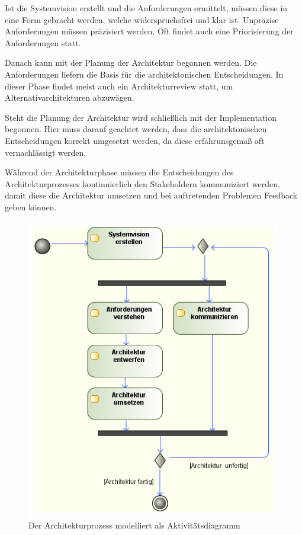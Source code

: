 Ist die Systemvision erstellt und die Anforderungen ermittelt, müssen diese in eine Form gebracht werden, welche widerspruchsfrei und klar ist. Unpräzise Anforderungen müssen präzisiert werden. Oft findet auch eine Priorisierung der Anforderungen statt. \cite[S. 353]{softarch}

Danach kann mit der Planung der Architektur begonnen werden. Die Anforderungen liefern die Basis für die architektonischen Entscheidungen. In dieser Phase findet meist auch ein Architekturreview statt, um Alternativarchitekturen abzuwägen. \cite[S. 353]{softarch}

Steht die Planung der Architektur wird schließlich mit der Implementation begonnen. Hier muss darauf geachtet werden, dass die architektonischen Entscheidungen korrekt umgesetzt werden, da diese erfahrunsgemäß oft vernachlässigt werden. \cite[S. 354]{softarch}

Während der Architekturphase müssen die Entscheidungen des Architekturprozesses kontinuierlich den Stakeholdern kommuniziert werden, damit diese die Architektur umsetzen und bei auftretenden Problemen Feedback geben können. \cite[S. 354]{softarch}

\begin{figure}[H]
    \centering
    \includegraphics[scale=0.6]{img/archcycle.png}
    \caption{Der Architekturprozess modelliert als Aktivitätsdiagramm \cite[Umschlag, S. 352]{softarch}}
    \label{fig:cycle}
\end{figure}

